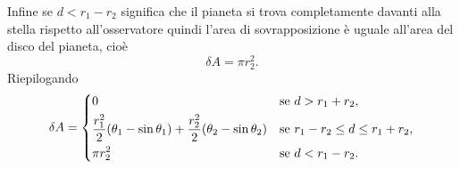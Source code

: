 Infine se $d < r_1 - r_2$ significa che il pianeta si trova completamente
davanti alla stella rispetto all'osservatore quindi l'area di sovrapposizione è
uguale all'area del disco del pianeta, cioè
\begin{equation}
  \delta A = \pi r_2^2.
\end{equation}
Riepilogando
\begin{equation}
  \delta A =
  \begin{dcases}
    0 & \text{se $d > r_1 + r_2$}, \\
    \frac{r_1^2}{2}(\theta_1 - \sin\theta_1) + \frac{r_2^2}{2}(\theta_2 -
    \sin\theta_2) & \text{se $r_1 - r_2 \leq d \leq r_1 + r_2$}, \\
    \pi r_2^2 & \text{se $d < r_1 - r_2$}.
  \end{dcases}
\end{equation}

